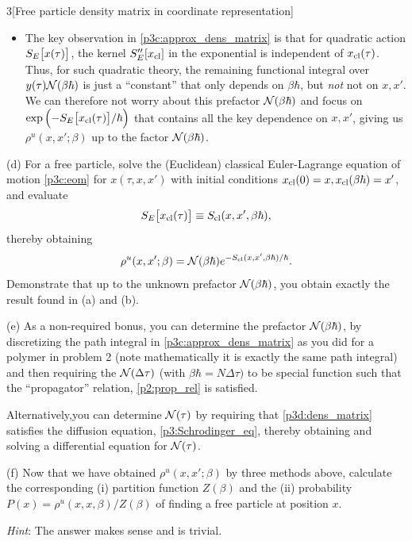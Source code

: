 \documentclass[12pt]{article}
\begin{document}
\begin{problem}{3}[Free particle density matrix in coordinate representation]
\begin{itemize}
    \item The key observation in \cref{p3c:approx_dens_matrix} is that for
        quadratic action $S_E\qty[x(\tau)]$, the kernel $S_E''\qty[x_{\text{cl}}]$
        in the exponential is independent of $x_{\text{cl}}(\tau)$. Thus, for such
        quadratic theory, the remaining functional integral over
        $y(\tau)\mathcal{N}(\beta\hbar)$ is just a ``constant'' that only depends on
        $\beta\hbar$, but \textit{not} not on $x,x'$. We can therefore not worry
        about this prefactor $\mathcal{N}(\beta\hbar)$ and focus on
        $\exp\qty(-S_E\qty[x_{\text{cl}}(\tau)]/\hbar)$ that contains all the key
        dependence on $x,x'$, giving us $\rho^u(x,x';\beta)$ up to the factor
        $\mathcal{N}(\beta\hbar)$.
\end{itemize}

\begin{solution}
    
\end{solution}

(d) For a free particle, solve the (Euclidean) classical Euler-Lagrange equation
of motion \cref{p3c:eom} for $x(\tau,x,x')$ with initial conditions
$x_{\text{cl}}(0)=x,x_{\text{cl}}(\beta\hbar)=x'$, and evaluate
\begin{equation}
    S_E\qty[x_{\text{cl}}(\tau)]\equiv S_{\text{cl}}(x,x',\beta\hbar), 
\end{equation}
thereby obtaining
\begin{equation}\label{p3d:dens_matrix}
    \rho^u(x,x';\beta)=\mathcal{N}(\beta\hbar)e^{-S_{\text{cl}}(x,x',\beta\hbar)/\hbar}. 
\end{equation}
Demonstrate that up to the unknown prefactor $\mathcal{N}(\beta\hbar)$, you obtain
exactly the result found in (a) and (b).
\begin{solution}
    
\end{solution}

(e) As a non-required bonus, you can determine the prefactor $\mathcal{N}(\beta\hbar)$,
by discretizing the path integral in \eqref{p3c:approx_dens_matrix} as you did
for a polymer in problem 2 (note mathematically it is exactly the same path
integral) and then requiring the $\mathcal{N}(\Delta\tau)$ (with
$\beta\hbar=N\Delta\tau)$ to be special function such that the ``propagator''
relation, \eqref{p2:prop_rel} is satisfied.

Alternatively,you can determine $\mathcal{N}(\tau)$ by requiring that
\eqref{p3d:dens_matrix} satisfies the diffusion equation,
\eqref{p3:Schrodinger_eq}, thereby obtaining and solving a differential equation
for $\mathcal{N}(\tau)$.
\begin{solution}
    
\end{solution}

(f) Now that we have obtained $\rho^u(x,x';\beta)$ by three methods above,
calculate the corresponding (i) partition function $Z(\beta)$ and the (ii)
probability $P(x)=\rho^u(x,x,\beta)/Z(\beta)$ of finding a free particle at
position $x$.

\textit{Hint}: The answer makes sense and is trivial.

\end{problem}
\newpage
\end{document}

